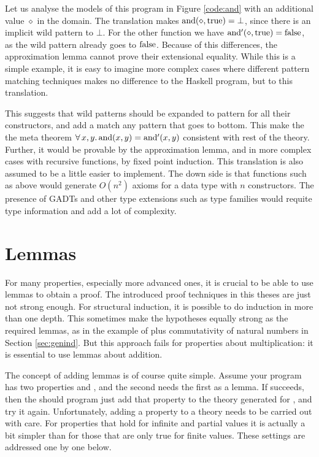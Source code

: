 Let us analyse the models of this program in Figure \ref{code:and}
with an additional value $\diamond$ in the domain. The translation
makes $\mathrm{and}(\diamond,\mathrm{true}) = \bot$, since there is an
implicit wild pattern to $\bot$. For the other function we
have $\mathrm{and'}(\diamond,\mathrm{true}) = \mathrm{false}$, as the wild pattern
already goes to $\mathrm{false}$. Because of this differences, the
approximation lemma cannot prove their extensional equality. While
this is a simple example, it is easy to imagine more complex cases
where different pattern matching techniques makes no difference to the
Haskell program, but to this translation.

This suggests that wild patterns should be expanded to pattern for all
their constructors, and add a match any pattern that goes to
bottom. This make the the meta theorem $\forall \, x , y . \, \mathrm{and}(x,y) =
\mathrm{and'}(x,y)$ consistent with rest of the theory.  Further, it would
be provable by the approximation lemma, and in more complex cases with
recursive functions, by fixed point induction. This translation is
also assumed to be a little easier to implement. The down side is that
functions such as  above would generate $O(n^2)$ axioms for
a data type with $n$ constructors. The presence of GADTs and other
type extensions such as type families would requite type information
and add a lot of complexity.

\section{Lemmas}

For many properties, especially more advanced ones, it is crucial to
be able to use lemmas to obtain a proof. The introduced proof
techniques in this theses are just not strong enough. For structural
induction, it is possible to do induction in more than one depth. This
sometimes make the hypotheses equally strong as the required lemmas,
as in the example of plus commutativity of natural numbers in Section
\ref{sec:genind}. But this approach fails for properties about
multiplication: it is essential to use lemmas about addition.

The concept of adding lemmas is of course quite simple. Assume your
program has two properties  and , and the
second needs the first as a lemma. If  succeeds, then the
should program just add that property to the theory generated for
, and try it again. Unfortunately, adding a property to a
theory needs to be carried out with care. For properties that hold for
infinite and partial values it is actually a bit simpler than for
those that are only true for finite values. These settings are
addressed one by one below.

